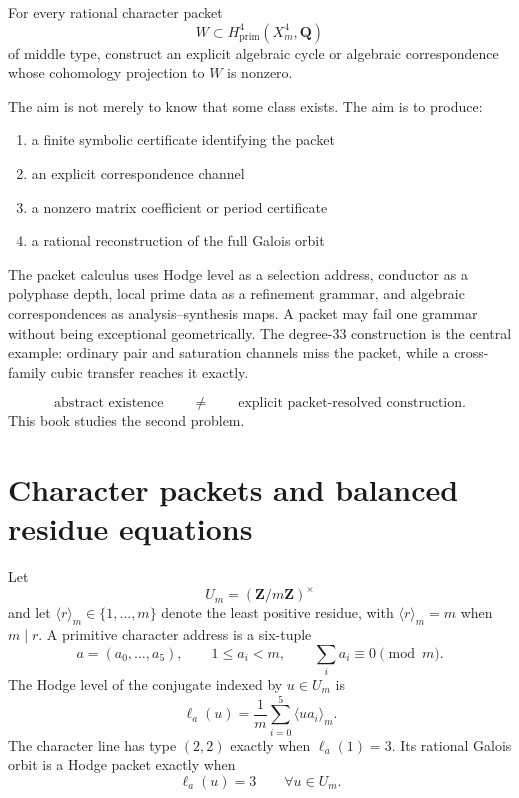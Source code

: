 \documentclass[11pt,oneside]{book}
\theoremstyle{definition}
\theoremstyle{remark}
\newcommand{\Q}{\mathbf{Q}}
\begin{document}
\begin{scopebox}
For every rational character packet
\[
W\subset H^4_{\mathrm{prim}}(X_m^4,\Q)
\]
of middle type, construct an explicit algebraic cycle or algebraic correspondence whose cohomology projection to \(W\) is nonzero.
\end{scopebox}

The aim is not merely to know that some class exists. The aim is to produce:
\begin{enumerate}
\item a finite symbolic certificate identifying the packet
\item an explicit correspondence channel
\item a nonzero matrix coefficient or period certificate
\item a rational reconstruction of the full Galois orbit
\end{enumerate}

The packet calculus uses Hodge level as a selection address, conductor as a polyphase depth, local prime data as a refinement grammar, and algebraic correspondences as analysis--synthesis maps. A packet may fail one grammar without being exceptional geometrically. The degree-\(33\) construction is the central example: ordinary pair and saturation channels miss the packet, while a cross-family cubic transfer reaches it exactly.

\begin{resultbox}
\[
\text{abstract existence}
\qquad\neq\qquad
\text{explicit packet-resolved construction}.
\]
This book studies the second problem.
\end{resultbox}


\chapter{Character packets and balanced residue equations}
Let
\[
U_m=(\mathbf Z/m\mathbf Z)^\times
\]
and let \(\langle r\rangle_m\in\{1,\ldots,m\}\) denote the least positive residue, with \(\langle r\rangle_m=m\) when \(m\mid r\). A primitive character address is a six-tuple
\[
a=(a_0,\ldots,a_5),\qquad 1\le a_i<m,
\qquad \sum_i a_i\equiv0\pmod m.
\]
The Hodge level of the conjugate indexed by \(u\in U_m\) is
\[
\ell_a(u)=\frac1m\sum_{i=0}^5\langle ua_i\rangle_m.
\]
The character line has type \((2,2)\) exactly when \(\ell_a(1)=3\). Its rational Galois orbit is a Hodge packet exactly when
\[
\boxed{
\ell_a(u)=3\qquad\forall u\in U_m.
}
\tag{B1}
\]
\end{document}
